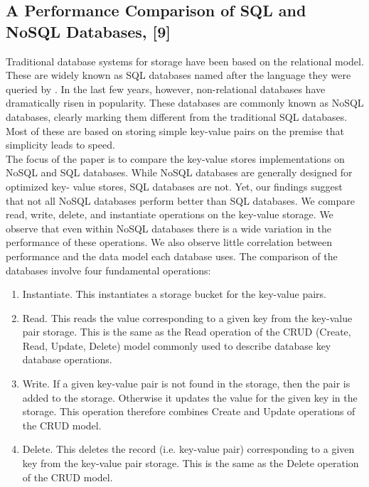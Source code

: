 \documentclass[12pt, a4paper]{article}
\begin{document}
\subsection{A Performance Comparison of SQL and NoSQL Databases, [9]}

\vspace{5mm}
Traditional database systems for storage have been based on the relational model. These are widely known as SQL databases named after the language they were queried by . In the last few years, however, non-relational databases have dramatically risen in popularity. These databases are commonly known as NoSQL databases, clearly marking them different from the traditional SQL databases. Most of these are based on storing simple key-value pairs on the premise that simplicity leads to speed.
\\

\hspace{5mm}The focus of the paper is to compare the key-value stores implementations on NoSQL and SQL databases. While NoSQL databases are generally designed for optimized key-
value stores, SQL databases are not. Yet, our findings suggest that not all NoSQL databases perform better than SQL databases. We compare read, write, delete, and instantiate operations on the key-value storage. We observe that even within NoSQL databases there is a wide variation in the performance of these operations. We also observe little correlation between performance and the data model each database uses. The comparison of the databases involve four fundamental operations:
\\

\begin{enumerate}[leftmargin=1.5cm]
\item Instantiate. This instantiates a storage bucket for the key-value pairs.
\item Read. This reads the value corresponding to a given key from the key-value pair storage. This is the same as the Read operation of the CRUD (Create, Read, Update, Delete) model commonly used to describe database key database operations.
\item  Write. If a given key-value pair is not found in the storage, then the pair is added to the storage. Otherwise  it updates the value for the given key in the storage. This operation therefore combines Create and Update operations of the CRUD model.
\item  Delete. This deletes the record (i.e. key-value pair) corresponding to a given key from the key-value pair storage. This is the same as the Delete operation of the CRUD model.
\end{enumerate}
\end{document}
